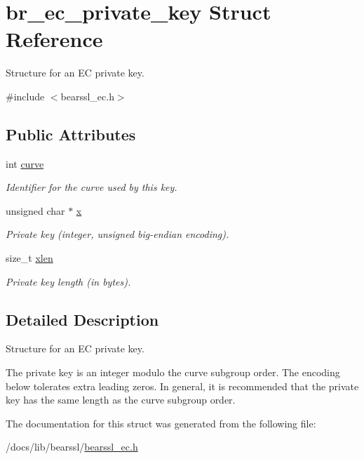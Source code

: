 \hypertarget{structbr__ec__private__key}{}\section{br\+\_\+ec\+\_\+private\+\_\+key Struct Reference}
\label{structbr__ec__private__key}


Structure for an EC private key.  




{\ttfamily \#include $<$bearssl\+\_\+ec.\+h$>$}

\subsection*{Public Attributes}
\begin{DoxyCompactItemize}
\item 
\mbox{\label{structbr__ec__private__key_ae18fadf79653c4b17ed7ca701cf696cc}} 
int \hyperlink{structbr__ec__private__key_ae18fadf79653c4b17ed7ca701cf696cc}{curve}
\begin{DoxyCompactList}\small\item\em Identifier for the curve used by this key. \end{DoxyCompactList}\item 
\mbox{\label{structbr__ec__private__key_a3df4d7dc8f5b2220b498e123a39b2798}} 
unsigned char $\ast$ \hyperlink{structbr__ec__private__key_a3df4d7dc8f5b2220b498e123a39b2798}{x}
\begin{DoxyCompactList}\small\item\em Private key (integer, unsigned big-\/endian encoding). \end{DoxyCompactList}\item 
\mbox{\label{structbr__ec__private__key_a287998c207df113e27ae61c19588c2f9}} 
size\+\_\+t \hyperlink{structbr__ec__private__key_a287998c207df113e27ae61c19588c2f9}{xlen}
\begin{DoxyCompactList}\small\item\em Private key length (in bytes). \end{DoxyCompactList}\end{DoxyCompactItemize}


\subsection{Detailed Description}
Structure for an EC private key. 

The private key is an integer modulo the curve subgroup order. The encoding below tolerates extra leading zeros. In general, it is recommended that the private key has the same length as the curve subgroup order. 

The documentation for this struct was generated from the following file\+:\begin{DoxyCompactItemize}
\item 
/docs/lib/bearssl/\hyperlink{bearssl__ec_8h}{bearssl\+\_\+ec.\+h}\end{DoxyCompactItemize}
